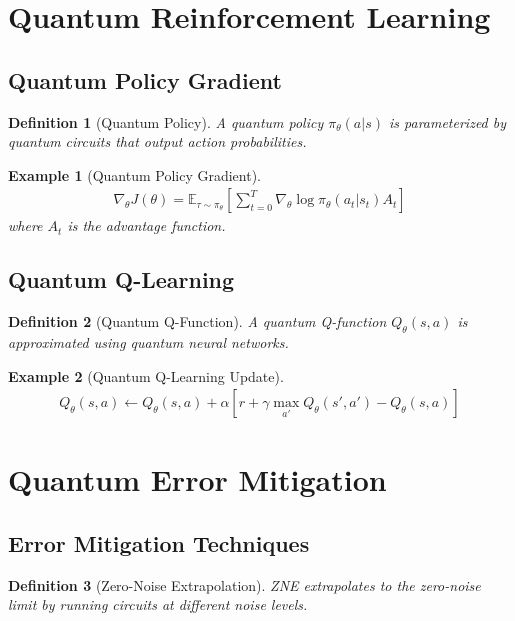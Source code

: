 \documentclass[11pt]{article}
\newtheorem{definition}{Definition}[section]
\newtheorem{example}{Example}[section]
\begin{document}
\section{Quantum Reinforcement Learning}

\subsection{Quantum Policy Gradient}

\begin{definition}[Quantum Policy]
A quantum policy $\pi_\theta(a|s)$ is parameterized by quantum circuits that output action probabilities.
\end{definition}

\begin{example}[Quantum Policy Gradient]
\begin{align}
\nabla_\theta J(\theta) = \mathbb{E}_{\tau \sim \pi_\theta}[\sum_{t=0}^T \nabla_\theta \log \pi_\theta(a_t|s_t) A_t]
\end{align}
where $A_t$ is the advantage function.
\end{example}

\subsection{Quantum Q-Learning}

\begin{definition}[Quantum Q-Function]
A quantum Q-function $Q_\theta(s,a)$ is approximated using quantum neural networks.
\end{definition}

\begin{example}[Quantum Q-Learning Update]
\begin{align}
Q_\theta(s,a) \leftarrow Q_\theta(s,a) + \alpha[r + \gamma \max_{a'} Q_\theta(s',a') - Q_\theta(s,a)]
\end{align}
\end{example}

\section{Quantum Error Mitigation}

\subsection{Error Mitigation Techniques}

\begin{definition}[Zero-Noise Extrapolation]
ZNE extrapolates to the zero-noise limit by running circuits at different noise levels.
\end{definition}
\end{document}
